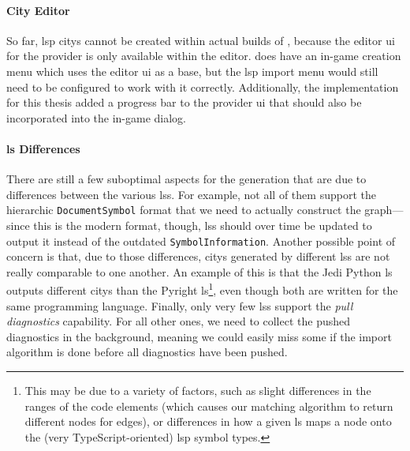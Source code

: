 \documentclass[../thesis]{subfiles}
\begin{document}
\paragraph{City Editor}
So far, \gls{lsp} \glspl{city} cannot be created within actual builds of \SEE{}, because the editor \gls{ui} for the \gls{provider} is only available within the \gls{editor}.
\SEE{} does have an in-game  creation menu which uses the editor \gls{ui} as a base, but the \gls{lsp} import menu would still need to be configured to work with it correctly.
Additionally, the implementation for this thesis added a progress bar to the \gls{provider} \gls{ui} that should also be incorporated into the in-game dialog.

\paragraph{\Gls{ls} Differences}
There are still a few suboptimal aspects for the  generation that are due to differences between the various \glspl{ls}.
For example, not all of them support the hierarchic \texttt{DocumentSymbol} format that we need to actually construct the graph---since this is the modern format, though, \glspl{ls} should over time be updated to output it instead of the outdated \texttt{SymbolInformation}.
Another possible point of concern is that, due to those differences, \glspl{city} generated by different \glspl{ls} are not really comparable to one another.
An example of this is that the Jedi Python \gls{ls} outputs different \glspl{city} than the Pyright \gls{ls}\footnote{
	This may be due to a variety of factors, such as slight differences in the \glspl{range} of the code elements (which causes our matching algorithm to return different nodes for edges), or differences in how a given \gls{ls} maps a node onto the (very TypeScript-oriented) \gls{lsp} symbol types.
}, even though both are written for the same programming language.
Finally, only very few \glspl{ls} support the \emph{pull diagnostics} \gls{capability}.
For all other ones, we need to collect the pushed diagnostics in the background, meaning we could easily miss some if the import algorithm is done before all diagnostics have been pushed.
\end{document}

